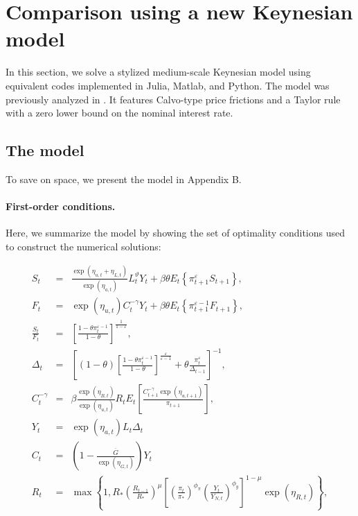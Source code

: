 
\section{Comparison using a new Keynesian model}

In this section, we solve a stylized medium-scale Keynesian model using equivalent codes implemented
in Julia, Matlab, and Python. The model was previously analyzed in \cite{MM2015}. It features
Calvo-type price frictions and a Taylor rule with a zero lower bound on the nominal interest rate.

\subsection{The model}

To save on space, we present the model in Appendix B.

\paragraph{First-order conditions.}

Here, we summarize the model by showing the set of optimality conditions
used to construct the numerical solutions:

\begin{eqnarray}
  S_{t} &=&\frac{\exp \left( \eta _{u,t}+\eta _{L,t}\right) }{\exp \left( \eta_{a,t}\right) }L_{t}^{\vartheta }Y_{t}+\beta \theta E_{t}\left \{ \pi_{t+1}^{\varepsilon }S_{t+1}\right \} ,  \label{NK1} \\
  F_{t} &=&\exp \left( \eta _{u,t}\right) C_{t}^{-\gamma }Y_{t}+\beta \theta E_{t}\left \{ \pi _{t+1}^{\varepsilon -1}F_{t+1}\right \} ,  \label{NK2} \\
  \frac{S_{t}}{F_{t}} &=&\left[ \frac{1-\theta \pi _{t}^{\varepsilon -1}}{1-\theta }\right] ^{\frac{1}{1-\varepsilon }},  \label{NK3} \\
  \Delta _{t} &=&\left[ \left( 1-\theta \right) \left[ \frac{1-\theta \pi _{t}^{\varepsilon -1}}{1-\theta }\right] ^{\frac{\varepsilon }{\varepsilon -1}}+\theta \frac{\pi _{t}^{\varepsilon }}{\Delta _{t-1}}\right] ^{-1}, \label{NK4} \\
  C_{t}^{-\gamma } &=&\beta \frac{\exp \left( \eta _{B,t}\right) }{\exp \left(\eta _{u,t}\right) }R_{t}E_{t}\left[ \frac{C_{t+1}^{-\gamma }\exp \left(\eta _{u,t+1}\right) }{\pi _{t+1}}\right] ,  \label{NK5} \\
  Y_{t} &=&\exp \left( \eta _{a,t}\right) L_{t}\Delta _{t}  \label{NKs1} \\
  C_{t} &=&\left( 1-\frac{\overline{G}}{\exp \left( \eta _{G,t}\right) }\right) Y_{t}  \label{NKs2} \\
  R_{t} &=&\max \left \{ 1,R_{\ast }\left( \frac{R_{t-1}}{R_{\ast }}\right)^{\mu }\left[ \left( \frac{\pi _{t}}{\pi _{\ast }}\right) ^{\phi _{\pi}}\left( \frac{Y_{t}}{Y_{N,t}}\right) ^{\phi _{y}}\right] ^{1-\mu }\exp
  \left( \eta _{R,t}\right) \right \} ,  \label{NK6}
\end{eqnarray}

